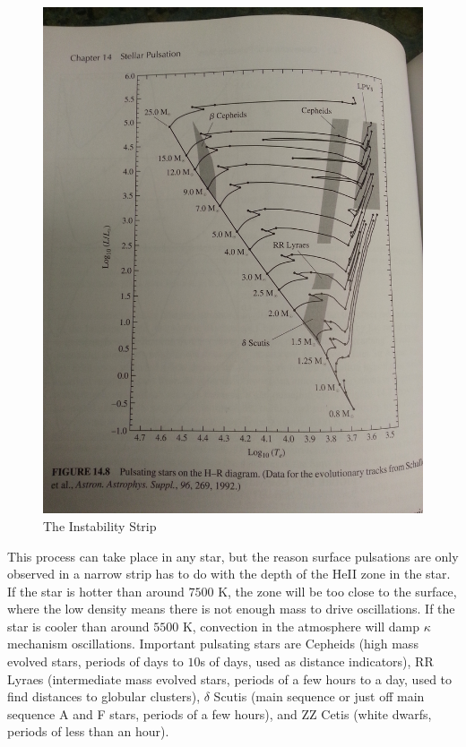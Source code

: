 \begin{figure}[!h]
\begin{center}
\includegraphics[width=\textwidth, angle=270]{strip.jpg}
\end{center}
\caption{The Instability Strip \label{fig:strip}}
\end{figure}


This process can take place in any star, but the reason surface pulsations 
are only observed in a narrow strip has to do with the depth of the HeII 
zone in the star.  If the star is hotter than around $7500$ K, the zone 
will be too close to the surface, where the low density means there is not 
enough mass to drive oscillations.  If the star is cooler than around $5500$ K, 
convection in the atmosphere will damp $\kappa$ mechanism oscillations.  
Important pulsating stars are Cepheids (high mass evolved stars, periods 
of days to $10$s of days, used as distance indicators), RR Lyraes (intermediate 
mass evolved stars, periods of a few hours to a day, used to find distances 
to globular clusters), $\delta$ Scutis (main sequence or just off main sequence 
A and F stars, periods of a few hours), and ZZ Cetis (white dwarfs, periods 
of less than an hour). 

